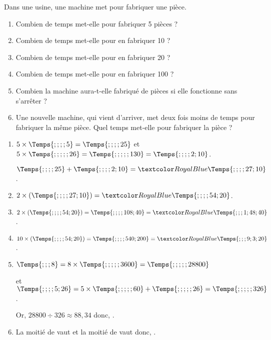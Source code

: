 \begin{Maquette}[Fiche,CorrigeFin,Colonnes=2]{}
\begin{multicols}{2}
      \begin{exercice} %
         Dans une usine, une machine met  pour fabriquer une pièce.
         \begin{enumerate}
            \item Combien de temps met-elle pour fabriquer 5 pièces ?
            \item Combien de temps met-elle pour en fabriquer 10 ?
            \item Combien de temps met-elle pour en fabriquer 20 ?
            \item Combien de temps met-elle pour en fabriquer 100 ?
            \item Combien la machine aura-t-elle fabriqué de pièces si elle fonctionne  sans s’arrêter ?
            \item Une nouvelle machine, qui vient d’arriver, met deux fois moins de temps pour fabriquer la même pièce. Quel temps met-elle pour fabriquer la pièce ?
         \end{enumerate}
      \end{exercice}
      
      \begin{Solution}
         \begin{enumerate}
            \item $5\times\Temps{;;;;5} =\Temps{;;;;25}$ et $5\times\Temps{;;;;;26} =\Temps{;;;;;130} =\Temps{;;;;2;10}$. \par
               $\Temps{;;;;25}+\Temps{;;;;2;10} =\cor{\Temps{;;;;27;10}}$.
            \item $2\times(\Temps{;;;;27;10}) =\cor{\Temps{;;;;54;20}}$.
            \item $2\times(\Temps{;;;;54;20}) =\Temps{;;;;108;40} =\cor{\Temps{;;;1;48;40}}$.
            \item $10\times(\Temps{;;;;54;20}) =\Temps{;;;;540;200} =\cor{\Temps{;;;9;3;20}}$.
            \item $\Temps{;;;8} =8\times\Temps{;;;;;3600} =\Temps{;;;;;28800}$ \par
               et $\Temps{;;;;5;26} =5\times\Temps{;;;;;60}+\Temps{;;;;;26} =\Temps{;;;;;326}$. \par
               Or, $\num{28800}\div326 \approx88,34$ donc, .
            \item La moitié de  vaut  et la moitié de  vaut  donc, .
         \end{enumerate}
      \end{Solution}
      

\end{multicols}
\end{Maquette}
